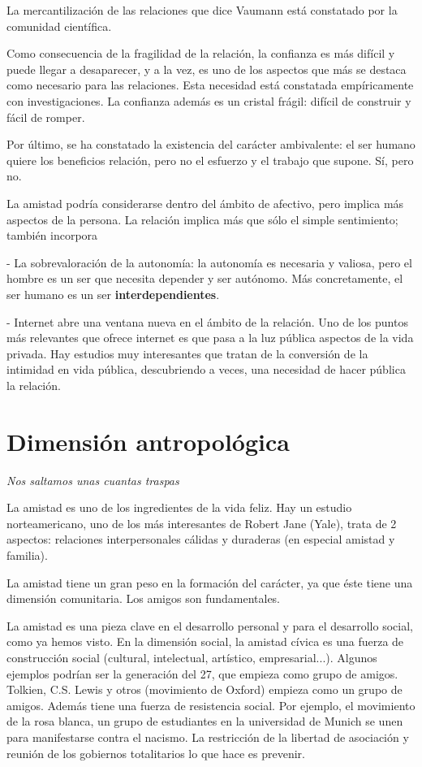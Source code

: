 \documentclass[palatino]{apuntesURJC}
\begin{document}
La mercantilización de las relaciones que dice Vaumann está constatado por la comunidad científica.

Como consecuencia de la fragilidad de la relación, la confianza es más difícil y puede llegar a desaparecer, y a la vez, es uno de los aspectos que más se destaca como necesario para las relaciones.
%
Esta necesidad está constatada empíricamente con investigaciones.
%
La confianza además es un cristal frágil: difícil de construir y fácil de romper.

Por último, se ha constatado la existencia del carácter ambivalente: el ser humano quiere los beneficios relación, pero no el esfuerzo y el trabajo que supone.
%
Sí, pero no.

La amistad podría considerarse dentro del ámbito de afectivo, pero implica más aspectos de la persona.
%
La relación implica más que sólo el simple sentimiento; también incorpora 

- La sobrevaloración de la autonomía: 
%
la autonomía es necesaria y valiosa, pero el hombre es un ser que necesita depender y ser autónomo. 
%
Más concretamente, el ser humano es un ser \textbf{interdependientes}. 

- Internet abre una ventana nueva en el ámbito de la relación.
%
Uno de los puntos más relevantes que ofrece internet es que pasa a la luz pública aspectos de la vida privada.
%
Hay estudios muy interesantes que tratan de la conversión de la intimidad en vida pública, descubriendo a veces, una necesidad de hacer pública la relación.


\section{Dimensión antropológica}

\textit{Nos saltamos unas cuantas traspas}

La amistad es uno de los ingredientes de la vida feliz.
%
Hay un estudio norteamericano, uno de los más interesantes de Robert Jane (Yale), trata de 2 aspectos: relaciones interpersonales cálidas y duraderas (en especial amistad y familia).

La amistad tiene un gran peso en la formación del carácter, ya que éste tiene una dimensión comunitaria. 
%
Los amigos son fundamentales.

La amistad es una pieza clave en el desarrollo personal y para el desarrollo social, como ya hemos visto.
%
En la dimensión social, la amistad cívica es una fuerza de construcción social (cultural, intelectual, artístico, empresarial...). Algunos ejemplos podrían ser la generación del 27, que empieza como grupo de amigos.
%
Tolkien, C.S. Lewis y otros (movimiento de Oxford) empieza como un grupo de amigos.
%
Además tiene una fuerza de resistencia social.
%
Por ejemplo, el movimiento de la rosa blanca, un grupo de estudiantes en la universidad de Munich se unen para manifestarse contra el nacismo.
%
La restricción de la libertad de asociación y reunión de los gobiernos totalitarios lo que hace es prevenir.
\end{document}
